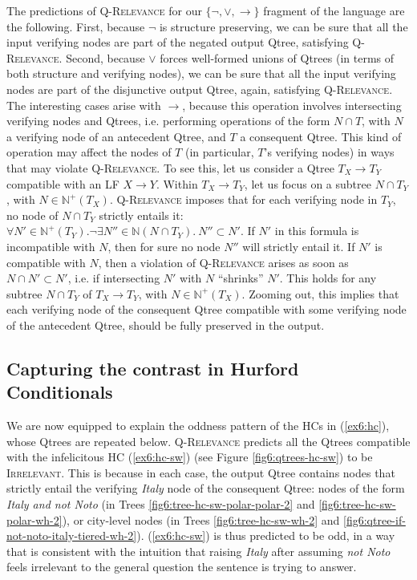 The predictions of \textsc{Q-Relevance} for our $\lbrace \neg, \vee, \rightarrow\rbrace$ fragment of the language are the following. First, because $\neg$ is structure preserving, we can be sure that all the input verifying nodes are part of the negated output Qtree, satisfying \textsc{Q-Relevance}. Second, because $\vee$ forces well-formed unions of Qtrees (in terms of both structure and verifying nodes), we can be sure that all the input verifying nodes are part of the disjunctive output Qtree, again, satisfying \textsc{Q-Relevance}. The interesting cases arise with $\rightarrow$, because this operation involves intersecting verifying nodes and Qtrees, i.e. performing operations of the form $N \cap T$, with $N$ a verifying node of an antecedent Qtree, and $T$ a consequent Qtree. This kind of operation may affect the nodes of $T$ (in particular, $T$'s verifying nodes) in ways that may violate \textsc{Q-Relevance}. To see this, let us consider a Qtree $T_X\rightarrow T_Y$ compatible with an LF $X \rightarrow Y$. Within $T_X\rightarrow T_Y$, let us focus on a subtree $N\cap T_Y$, with $N \in \mathbb{N}^+(T_X)$. \textsc{Q-Relevance} imposes that for each verifying node in $T_Y$, no node of $N\cap T_Y$ strictly entails it: $\forall N' \in \mathbb{N}^+(T_Y). \neg \exists N'' \in \mathbb{N}(N\cap T_Y). \ N'' \subset N'$. If $N'$ in this formula is incompatible with $N$, then for sure no node $N''$ will strictly entail it. If $N'$ is compatible with $N$, then a violation of \textsc{Q-Relevance} arises as soon as $N \cap N' \subset N'$, i.e. if intersecting $N'$ with $N$ ``shrinks'' $N'$. This holds for any subtree $N\cap T_Y$ of $T_X\rightarrow T_Y$, with $N \in \mathbb{N}^+(T_X)$. Zooming out, this implies that each verifying node of the consequent Qtree compatible with some verifying node of the antecedent Qtree, should be fully preserved in the output.\\


\subsection{Capturing the contrast in Hurford Conditionals}

We are now equipped to explain the oddness pattern of the HCs in (\ref{ex6:hc}), whose Qtrees are repeated below. \textsc{Q-Relevance} predicts all the Qtrees compatible with the infelicitous HC (\ref{ex6:hc-sw}) (see Figure \ref{fig6:qtrees-hc-sw}) to be \textsc{Irrelevant}. This is because in each case, the output Qtree contains nodes that strictly entail the verifying \textit{Italy} node of the consequent Qtree: nodes of the form \textit{Italy and not Noto} (in Trees \ref{fig6:tree-hc-sw-polar-polar-2} and \ref{fig6:tree-hc-sw-polar-wh-2}), or city-level nodes (in Trees \ref{fig6:tree-hc-sw-wh-2} and \ref{fig6:qtree-if-not-noto-italy-tiered-wh-2}). (\ref{ex6:hc-sw}) is thus predicted to be odd, in a way that is consistent with the intuition that raising \textit{Italy} after assuming \textit{not Noto} feels irrelevant to the general question the sentence is trying to answer.


